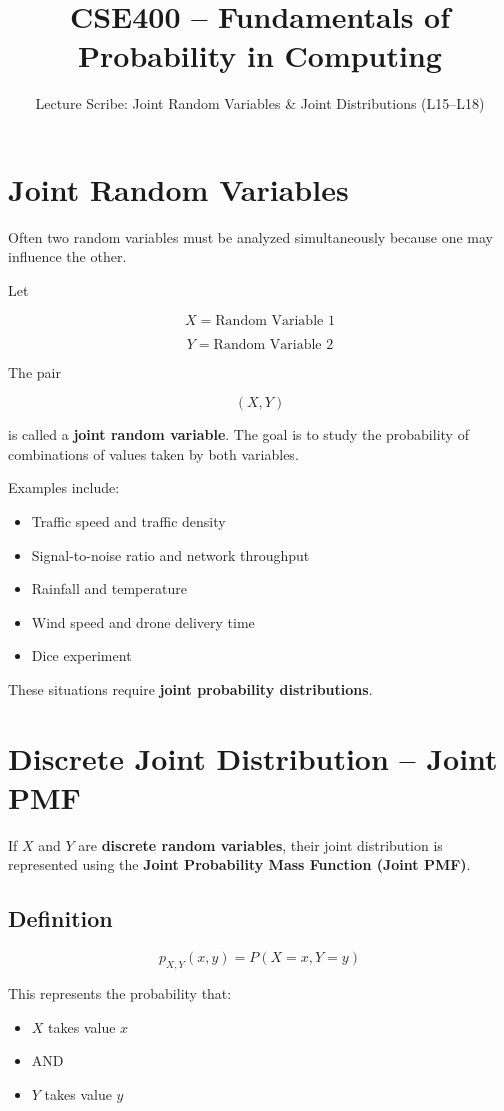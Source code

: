 \documentclass[12pt]{article}
\title{CSE400 -- Fundamentals of Probability in Computing}
\author{Lecture Scribe: Joint Random Variables \& Joint Distributions (L15--L18)}
\date{}
\begin{document}
\maketitle

\section{Joint Random Variables}

Often two random variables must be analyzed simultaneously because one may influence the other.

Let

\[
X = \text{Random Variable 1}
\]

\[
Y = \text{Random Variable 2}
\]

The pair

\[
(X,Y)
\]

is called a \textbf{joint random variable}. The goal is to study the probability of combinations of values taken by both variables.

Examples include:

\begin{itemize}
\item Traffic speed and traffic density
\item Signal-to-noise ratio and network throughput
\item Rainfall and temperature
\item Wind speed and drone delivery time
\item Dice experiment
\end{itemize}

These situations require \textbf{joint probability distributions}.

\section{Discrete Joint Distribution -- Joint PMF}

If $X$ and $Y$ are \textbf{discrete random variables}, their joint distribution is represented using the \textbf{Joint Probability Mass Function (Joint PMF)}.

\subsection{Definition}

\[
p_{X,Y}(x,y) = P(X=x, Y=y)
\]

This represents the probability that:

\begin{itemize}
\item $X$ takes value $x$
\item AND
\item $Y$ takes value $y$
\end{itemize}
\end{document}

